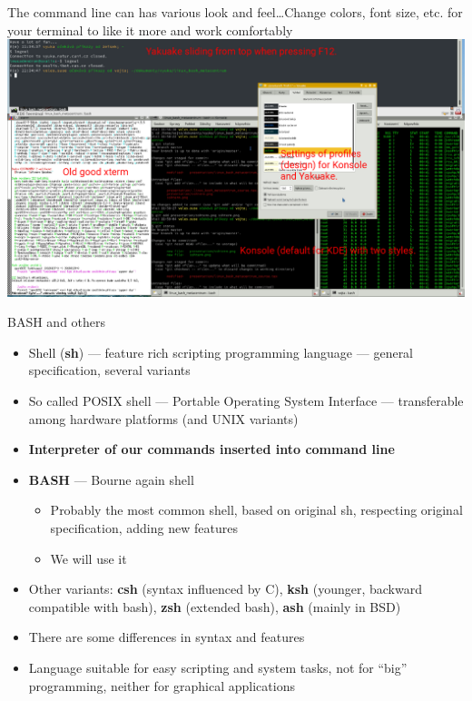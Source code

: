 \documentclass[compress, ucs, xelatex, 11pt, xcolor=svgnames,
  hyperref={
    bookmarks=true,
    unicode=true,
    colorlinks=true,
    pdftitle={Linux, command line and MetaCentrum},
    plainpages=false,
    pdfauthor={Vojtech Zeisek},
    pdfsubject={Course about use of Linux command line, writing shell scripts and using MetaCentrum of CESNET},
    pdfcreator={XeLaTeX},
    pdfkeywords={Linux, GNU, BASH, shell, command line, MetaCentrum},
    linkcolor=DarkRed,
    anchorcolor=DarkBlue,
    citecolor=Indigo,
    filecolor=NavyBlue,
    menucolor=DarkMagenta,
    urlcolor=DarkBlue,
    pdftex},
  url={hyphens, lowtilde} %
  ]{beamer}
\begin{document}
\begin{frame}{The command line can has various look and feel\ldots}{Change colors, font size, etc. for your terminal to like it more and work comfortably}
  \includegraphics[width=\textwidth]{terminals.png}
\end{frame}

\begin{frame}{BASH and others}
  \begin{itemize}
    \item Shell (\textbf{sh}) --- feature rich scripting programming language --- general specification, several variants
    \item So called POSIX shell --- Portable Operating System Interface --- transferable among hardware platforms (and UNIX variants)
    \item \textbf{Interpreter of our commands inserted into command line}
    \item \textbf{BASH} --- Bourne again shell
    \begin{itemize}
      \item Probably the most common shell, based on original sh, respecting original specification, adding new features
      \item We will use it
    \end{itemize}
    \item Other variants: \textbf{csh} (syntax influenced by C), \textbf{ksh} (younger, backward compatible with bash), \textbf{zsh} (extended bash), \textbf{ash} (mainly in BSD)
    \item There are some differences in syntax and features
    \item Language suitable for easy scripting and system tasks, not for ``big'' programming, neither for graphical applications
  \end{itemize}
\end{frame}
\end{document}
